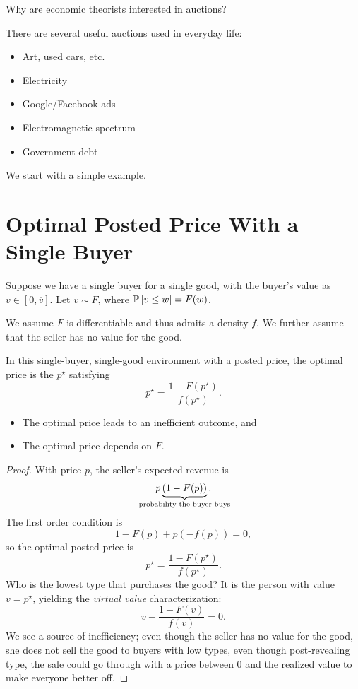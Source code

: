 
Why are economic theorists interested in auctions?

\begin{example}
	There are several useful auctions used in everyday life:
	\begin{itemize}
		\item Art, used cars, etc.
		\item Electricity \faLightbulb
		\item Google/Facebook ads
		\item Electromagnetic spectrum
		\item Government debt
	\end{itemize}
\end{example}

We start with a simple example.

\section{Optimal Posted Price With a Single Buyer}

Suppose we have a single buyer for a single good, with the buyer's value as $v \in [0,\overline{v}]$. 
Let $v \sim F$, where $\P\left[v \le w\right] = F(w)$.
\begin{assumption}
	We assume $F$ is differentiable and thus admits a density $f$. We further assume that the seller has no value for the good.
\end{assumption}

\begin{proposition} \label{4-22-3}
	In this single-buyer, single-good environment with a posted price, the optimal price is the $p^\star$ satisfying \[
		p^\star = \frac{1-F(p^\star)}{f(p^\star)}
	.\] 
	\begin{itemize}
		\item The optimal price leads to an inefficient outcome, and
		\item The optimal price depends on $F$.
	\end{itemize}
\end{proposition}
\begin{proof}
	With price $p$, the seller's expected revenue is \[
		p \underbrace{(1- F(p))}_{\mathclap{\text{probability the buyer buys}}}
	.\] 
	The first order condition is \[
		1-F(p) + p\left( -f(p) \right) = 0
	,\] so the optimal posted price is \[
		p^\star = \frac{1-F(p^\star)}{f(p^\star)}
	.\] 
	Who is the lowest type that purchases the good? It is the person with value $v = p^\star$, yielding the \emph{virtual value} characterization: \[
		v - \frac{1-F(v)}{f(v)} = 0
	.\] 
	We see a source of inefficiency; even though the seller has no value for the good, she does not sell the good to buyers with low types, even though post-revealing type, the sale could go through with a price between $0$ and the realized value to make everyone better off.
\end{proof}

